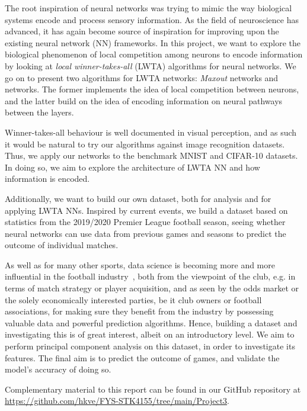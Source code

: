 The root inspiration of neural networks was trying to mimic the way biological systems encode and process sensory information. As the field of neuroscience has advanced, it has again become source of inspiration for improving upon the existing neural network (NN) frameworks. In this project, we want to explore the biological phenomenon of local competition among neurons to encode information by looking at \textit{local winner-takes-all} (LWTA) algorithms for neural networks. We go on to present two algorithms for LWTA networks: \textit{Maxout} networks and  networks. The former implements the idea of local competition between neurons, and the latter build on the idea of encoding information on neural pathways between the layers.

Winner-takes-all behaviour is well documented in visual perception, and as such it would be natural to try our algorithms against image recognition datasets. Thus, we apply our networks to the benchmark MNIST and CIFAR-10 datasets. In doing so, we aim to explore the architecture of LWTA NN and how information is encoded.

Additionally, we want to build our own dataset, both for analysis and for applying LWTA NNs. Inspired by current events, we build a dataset based on statistics from the 2019/2020 Premier League football season, seeing whether neural networks can use data from previous games and seasons to predict the outcome of individual matches.

As well as for many other sports, data science is becoming more and more influential in the football industry~\citep{Herbinet2018}, both from the viewpoint of the club, e.g. in terms of match strategy or player acquisition, and as seen by the odds market or the solely economically interested parties, be it club owners or football associations, for making sure they benefit from the industry by possessing valuable data and powerful prediction algorithms. Hence, building a dataset and investigating this is of great interest, albeit on an introductory level. We aim to perform principal component analysis on this dataset, in order to investigate its features. The final aim is to predict the outcome of games, and validate the model's accuracy of doing so. 

Complementary material to this report can be found in our GitHub repository at \url{https://github.com/hkve/FYS-STK4155/tree/main/Project3}. 

